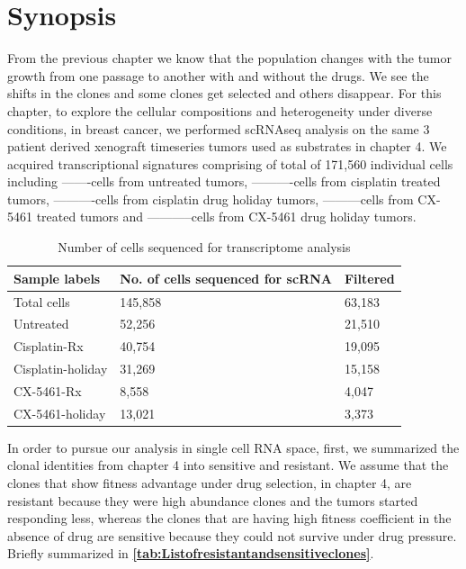  \section{Synopsis}
 From the previous chapter we know that the population changes with the tumor growth from one passage to another with and without the drugs. We see the shifts in the clones and some clones get selected and others disappear.
For this chapter, to explore the cellular compositions and heterogeneity under diverse conditions, in breast cancer, we performed scRNAseq analysis on the same 3 patient derived xenograft timeseries tumors used as substrates in chapter 4. We acquired transcriptional signatures comprising of total of 171,560 individual cells including -------cells from untreated tumors, ----------cells from cisplatin treated tumors, ----------cells from cisplatin drug holiday tumors, ---------cells from CX-5461 treated tumors and -----------cells from CX-5461 drug holiday tumors.

\begin{table}[htbp]
 \centering
  \caption{Number of cells sequenced for transcriptome analysis}
{
\begin{tabular}{|l|l|l|}
\hline
Sample labels     & No. of cells sequenced for scRNA & Filtered \\
\hline
Total cells          & 145,858                          & 63,183\\
Untreated         & 52,256                           & 21,510    \\
Cisplatin-Rx      & 40,754                           & 19,095    \\
Cisplatin-holiday & 31,269                           & 15,158    \\
CX-5461-Rx        & 8,558                            & 4,047     \\
CX-5461-holiday   & 13,021                           & 3,373  \\  
\hline
\end{tabular}%

}
\end{table}





 
In order to pursue our analysis in single cell RNA space, first, we summarized the clonal identities from chapter 4 into sensitive and resistant. We assume that the clones that show fitness advantage under drug selection, in chapter 4, are resistant because they were high abundance clones and the tumors started responding less, whereas the clones that are having high fitness coefficient in the absence of drug are sensitive because they could not survive under drug pressure. Briefly summarized in  \textbf{\autoref{tab:Listofresistantandsensitiveclones}}.
 
